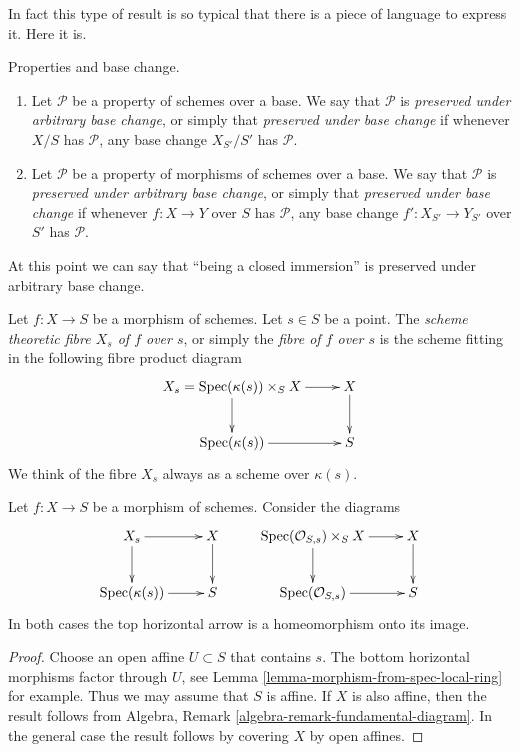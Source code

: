 \noindent
In fact this type of result is so typical that there is a
piece of language to express it. Here it is.

\begin{definition}
\label{definition-preserved-by-base-change}
Properties and base change.
\begin{enumerate}
\item Let $\mathcal{P}$ be a property of schemes over a base.
We say that $\mathcal{P}$ is {\it preserved under arbitrary base change},
or simply that {\it preserved under base change} if whenever $X/S$
has $\mathcal{P}$, any base change $X_{S'}/S'$ has $\mathcal{P}$.
\item Let $\mathcal{P}$ be a property of morphisms of schemes over a base.
We say that $\mathcal{P}$ is {\it preserved under arbitrary base change},
or simply that {\it preserved under base change} if whenever
$f : X \to Y$ over $S$ has $\mathcal{P}$, any base change
$f' : X_{S'} \to Y_{S'}$ over $S'$ has $\mathcal{P}$.
\end{enumerate}
\end{definition}

\noindent
At this point we can say that ``being a closed immersion'' is
preserved under arbitrary base change.

\begin{definition}
\label{definition-fibre}
Let $f : X \to S$ be a morphism of schemes.
Let $s \in S$ be a point.
The {\it scheme theoretic fibre $X_s$ of $f$ over $s$},
or simply the {\it fibre of $f$ over $s$}
is the scheme fitting in the following fibre product diagram
$$
\xymatrix{
X_s = \Spec(\kappa(s)) \times_S X \ar[r] \ar[d] &
X \ar[d] \\
\Spec(\kappa(s)) \ar[r] &
S
}
$$
We think of the fibre $X_s$ always as a scheme over $\kappa(s)$.
\end{definition}

\begin{lemma}
\label{lemma-fibre-topological}
Let $f : X \to S$ be a morphism of schemes.
Consider the diagrams
$$
\xymatrix{
X_s \ar[r] \ar[d] &
X \ar[d] &
\Spec(\mathcal{O}_{S, s}) \times_S X \ar[r] \ar[d] &
X \ar[d]
\\
\Spec(\kappa(s)) \ar[r] &
S &
\Spec(\mathcal{O}_{S, s}) \ar[r] &
S
}
$$
In both cases the top horizontal arrow is a homeomorphism
onto its image.
\end{lemma}

\begin{proof}
Choose an open affine $U \subset S$ that contains $s$.
The bottom horizontal morphisms factor through $U$, see
Lemma \ref{lemma-morphism-from-spec-local-ring} for example.
Thus we may assume that $S$ is affine. If $X$ is also affine, then
the result follows from
Algebra, Remark \ref{algebra-remark-fundamental-diagram}.
In the general case the result follows by covering $X$ by open affines.
\end{proof}







